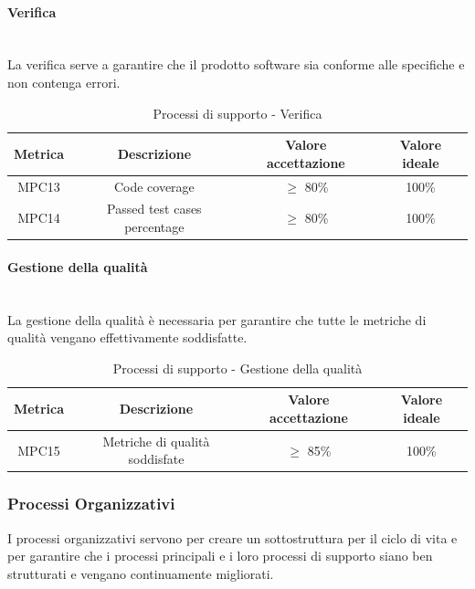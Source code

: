 \documentclass[10pt]{article}
\begin{document}
\begin{justify}
\paragraph{Verifica}\mbox{}\\
La verifica serve a garantire che il prodotto software sia conforme alle specifiche e non contenga errori.\\
\begin{table}[H]
  \centering
\begin{tabular}{|c|c|c|c|}
  \hline
  \textbf{Metrica} & \textbf{Descrizione} & \textbf{Valore accettazione} & \textbf{Valore ideale}\\
  \hline
  MPC13 & Code coverage & $\geq$ 80\% & 100\% \\
  \hline
  MPC14 & Passed test cases percentage & $\geq$ 80\% & 100\% \\
  \hline
\end{tabular}
\caption{Processi di supporto - Verifica}
\label{tab:verifica}
\end{table}

\paragraph{Gestione della qualità}\mbox{}\\
La gestione della qualità è necessaria per garantire che tutte le metriche di qualità vengano effettivamente soddisfatte.\\
\begin{table}[H]
  \centering
\begin{tabular}{|c|c|c|c|}
  \hline
  \textbf{Metrica} & \textbf{Descrizione} & \textbf{Valore accettazione} & \textbf{Valore ideale}\\
  \hline
  MPC15 & Metriche di qualità soddisfate & $\geq$ 85\% & 100\% \\
  \hline
\end{tabular}
\caption{Processi di supporto - Gestione della qualità}
\label{tab:gestione della qualità}
\end{table}

\subsubsection{Processi Organizzativi}
I processi organizzativi servono per creare un sottostruttura per il ciclo di vita e
per garantire che i processi principali e i loro processi di supporto siano ben strutturati e vengano continuamente migliorati.\\

\end{justify}
\end{document}
